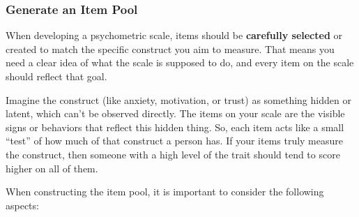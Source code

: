 \documentclass[
  letterpaper,
  DIV=11,
  numbers=noendperiod]{scrartcl}
\begin{document}
\hypertarget{generate-an-item-pool}{%
\subsubsection*{Generate an Item Pool}\label{generate-an-item-pool}}

When developing a psychometric scale, items should be \textbf{carefully
selected} or created to match the specific construct you aim to measure.
That means you need a clear idea of what the scale is supposed to do,
and every item on the scale should reflect that goal.

Imagine the construct (like anxiety, motivation, or trust) as something
hidden or latent, which can't be observed directly. The items on your
scale are the visible signs or behaviors that reflect this hidden thing.
So, each item acts like a small ``test'' of how much of that construct a
person has. If your items truly measure the construct, then someone with
a high level of the trait should tend to score higher on all of them.

When constructing the item pool, it is important to consider the
following aspects:
\end{document}
